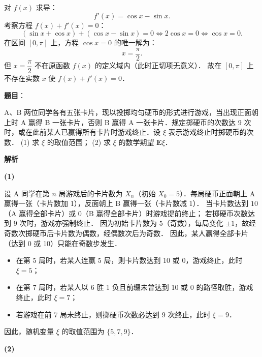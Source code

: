 \begin{answer}
对 $f(x)$ 求导：
\nopagebreak[4]
\[
f'(x) = \cos x - \sin x.
\]
考察方程 $f(x) + f'(x) = 0$：
\nopagebreak[4]
\[
(\sin x + \cos x) + (\cos x - \sin x) = 0 \iff 2\cos x = 0 \iff \cos x = 0.
\]
在区间 $[0, \pi]$ 上，方程 $\cos x = 0$ 的唯一解为：
\nopagebreak[4]
\[
x = \dfrac{\pi}{2}.
\]
但 $x = \dfrac{\pi}{2}$ 不在原函数 $f(x)$ 的定义域内（此时正切项无意义）．
故在 $[0, \pi]$ 上不存在实数 $x$ 使 $f(x) + f'(x) = 0$．


\end{answer}
\begin{answer}

\textbf{题目}：

A、B 两位同学各有五张卡片，现以投掷均匀硬币的形式进行游戏，当出现正面朝上时 A 赢得 B 一张卡片，否则 B 赢得 A 一张卡片．规定掷硬币的次数达 9 次时，或在此前某人已赢得所有卡片时游戏终止．设 $\xi$ 表示游戏终止时掷硬币的次数．
(1) 求 $\xi$ 的取值范围；
(2) 求 $\xi$ 的数学期望 $\mathbf{E}\xi$．

\textbf{解析}

\textbf{(1)}

设 A 同学在第 $n$ 局游戏后的卡片数为 $X_n$（初始 $X_0 = 5$）．每局硬币正面朝上 A 赢得一张（卡片数加 1），反面朝上 B 赢得一张（卡片数减 1）．
当卡片数达到 $10$（A 赢得全部卡片）或 $0$（B 赢得全部卡片）时游戏提前终止；
若掷硬币次数达到 9 次时，游戏亦强制终止．
因为初始卡片数为 $5$（奇数），每局变化 $\pm 1$，故经奇数次掷硬币后卡片数为偶数，经偶数次后为奇数．
因此，某人赢得全部卡片（达到 0 或 10）只能在奇数步发生．
\begin{itemize}
\item 在第 5 局时，若某人连赢 5 局，则卡片数达到 10 或 0，游戏终止，此时 $\xi = 5$；
\item 在第 7 局时，若某人以 6 胜 1 负且前缀未曾达到 10 或 0 的路径取胜，游戏终止，此时 $\xi = 7$；
\item 若游戏在前 7 局未终止，则掷硬币次数必达到 9 次终止，此时 $\xi = 9$．
\end{itemize}

因此，随机变量 $\xi$ 的取值范围为 $\{5, 7, 9\}$．

\textbf{(2)}


\end{answer}
